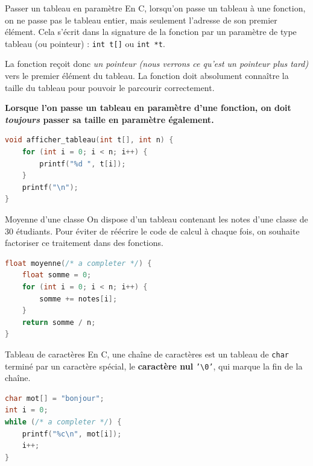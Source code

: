 \begin{UPSTIinfo}{Passer un tableau en paramètre}
    En C, lorsqu'on passe un tableau à une fonction, on ne passe pas le tableau entier, mais seulement l'adresse de son premier élément. Cela s'écrit dans la signature de la fonction par un paramètre de type tableau (ou pointeur) : \texttt{int t[]} ou \texttt{int *t}.
    
    La fonction reçoit donc \textit{un pointeur (nous verrons ce qu'est un pointeur plus tard)} vers le premier élément du tableau. La fonction doit absolument connaître la taille du tableau pour pouvoir le parcourir correctement. 

    \textbf{Lorsque l'on passe un tableau en paramètre d'une fonction, on doit \textit{toujours} passer sa taille en paramètre également.}

    \begin{lstlisting}[language=C]
void afficher_tableau(int t[], int n) {
    for (int i = 0; i < n; i++) {
        printf("%d ", t[i]);
    }
    printf("\n");
}
    \end{lstlisting}
\end{UPSTIinfo}

\begin{UPSTIexercice}{Moyenne d'une classe}
    On dispose d'un tableau contenant les notes d'une classe de 30 étudiants. Pour éviter de réécrire le code de calcul à chaque fois, on souhaite factoriser ce traitement dans des fonctions.

    \begin{lstlisting}[language=C]
float moyenne(/* a completer */) {
    float somme = 0;
    for (int i = 0; i < n; i++) {
        somme += notes[i];
    }
    return somme / n;
}
    \end{lstlisting}

\end{UPSTIexercice}

\begin{UPSTIexercice}{Tableau de caractères}
    En C, une chaîne de caractères est un tableau de \texttt{char} terminé par un caractère spécial, le \textbf{caractère nul} \texttt{'\textbackslash 0'}, qui marque la fin de la chaîne.

    \begin{lstlisting}[language=C]
char mot[] = "bonjour";
int i = 0;
while (/* a completer */) {
    printf("%c\n", mot[i]);
    i++;
}
    \end{lstlisting}

\end{UPSTIexercice}


